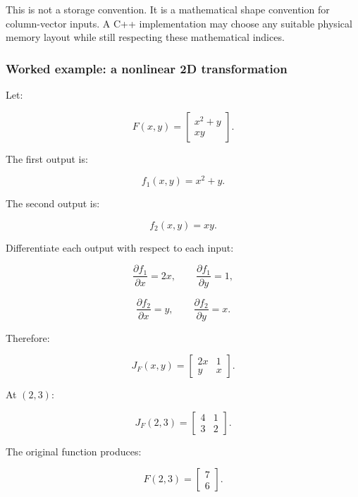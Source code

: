 This is not a storage convention. It is a mathematical shape convention for column-vector inputs. A C++ implementation may choose any suitable physical memory layout while still respecting these mathematical indices.

\begin{allmightroleexample}

\subsubsection{Worked example: a nonlinear 2D transformation}\label{02-foundations-ii-ch021-worked-example-a-nonlinear-2d-transformation}

\hypertarget{02-foundations-ii-ch021-worked-example-a-nonlinear-2d-transformation}{}

Let:

\end{allmightroleexample}

\[
F(x,y)= \begin{bmatrix} x^2+y\\ xy \end{bmatrix}.
\]

The first output is:

\[
f_1(x,y)=x^2+y.
\]

The second output is:

\[
f_2(x,y)=xy.
\]

Differentiate each output with respect to each input:

\[
\frac{\partial f_1}{\partial x}=2x,\qquad \frac{\partial f_1}{\partial y}=1,
\]

\[
\frac{\partial f_2}{\partial x}=y,\qquad \frac{\partial f_2}{\partial y}=x.
\]

Therefore:

\[
\boxed{ J_F(x,y)= \begin{bmatrix} 2x&1\\ y&x \end{bmatrix} }.
\]

At \((2,3)\):

\[
J_F(2,3)= \begin{bmatrix} 4&1\\ 3&2 \end{bmatrix}.
\]

The original function produces:

\[
F(2,3)= \begin{bmatrix}7\\6\end{bmatrix}.
\]

